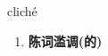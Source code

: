 
\begin{frame}
{\huge cliché}
\begin{center}
\begin{enumerate}\Large
  \item \textbf{陈词滥调(的)}
\end{enumerate}
\end{center}
\end{frame}
